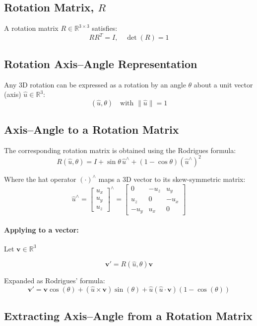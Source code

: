 \documentclass[11pt,a4paper]{article}
\begin{document}
\subsection*{Rotation Matrix, \( R \)}
A rotation matrix \( R \in \mathbb{R}^{3 \times 3} \) satisfies:
\[
R R^T = I, \quad \det(R) = 1
\]

\subsection*{Rotation Axis--Angle Representation}

Any 3D rotation can be expressed as a rotation by an angle \( \theta \) about a unit vector (axis) \( \hat{u} \in \mathbb{R}^3 \):
\[
(\hat{u}, \theta) \quad \text{with } \| \hat{u} \| = 1
\]

\subsection*{Axis--Angle to a Rotation Matrix}

The corresponding rotation matrix is obtained using the Rodrigues formula:
\[
R(\hat{u}, \theta) = I + \sin\theta \, \hat{u}^\wedge + (1 - \cos\theta)(\hat{u}^\wedge)^2
\]

Where the hat operator \( (\cdot)^\wedge \) maps a 3D vector to its skew-symmetric matrix:
\[
\hat{u}^\wedge =
\begin{bmatrix}
        u_x \\
        u_y \\
        u_z
\end{bmatrix}^\wedge =
\begin{bmatrix}
0 & -u_z & u_y \\
u_z & 0 & -u_x \\
-u_y & u_x & 0
\end{bmatrix}
\]

\paragraph{Applying to a vector: } Let \( \mathbf{v} \in \mathbb{R}^3 \)

\[
\mathbf{v}' = R(\hat{u}, \theta) \mathbf{v}
\]

Expanded as Rodrigues' formula:
\[
\mathbf{v}' = \mathbf{v} \cos(\theta) + (\hat{u} \times \mathbf{v}) \sin(\theta) + \hat{u} (\hat{u} \cdot \mathbf{v})(1-\cos(\theta))
\]

\subsection*{Extracting Axis--Angle from a Rotation Matrix}
\end{document}
